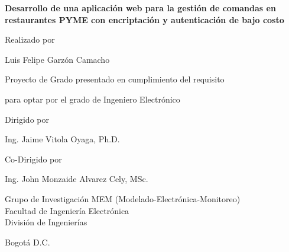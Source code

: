 {\begin{titlepage}
\begin{center}
		\end{center}
	\end{titlepage}
	
	\newpage
	\thispagestyle{empty}
	\fontsize{10}{12}\selectfont
	\vspace*{-2cm}
	\begin{center}
		
		\bhrule
		\vspace{0.3cm}
		{\Large \bfseries Desarrollo de una aplicación web para la gestión de comandas en restaurantes PYME con encriptación y autenticación de bajo costo \par}
		\bhrule
		
		\vfill
		\vspace{0.5cm}
		
		{\large Realizado por \par}
		\smallskip
		{\Large Luis Felipe Garzón Camacho \par}
		
		\vfill
		
		{\large Proyecto de Grado presentado en cumplimiento del requisito \par para optar por el grado de Ingeniero Electrónico \par}
		
		\vfill
		\vspace{1cm}
		
		{\large Dirigido por\par}
		{\Large Ing. Jaime Vitola Oyaga, Ph.D. \par} 
		
		\vfill
		\vspace{0.5cm}
		
		{\large Co-Dirigido por\par}
		{\Large Ing. John Monzaide Alvarez Cely, MSc. \par}
		
		\vfill
		\vspace{1cm}
		
		{Grupo de Investigación MEM (Modelado-Electrónica-Monitoreo)} \\
		{Facultad de Ingeniería Electrónica} \\
		{División de Ingenierías} \\
		
		\bigskip
		\bigskip
		
		{\large Bogotá D.C. \par}
		
		{\large \proyectoFechaCompleta \par}
		\bigskip
		
	\end{center}
}

